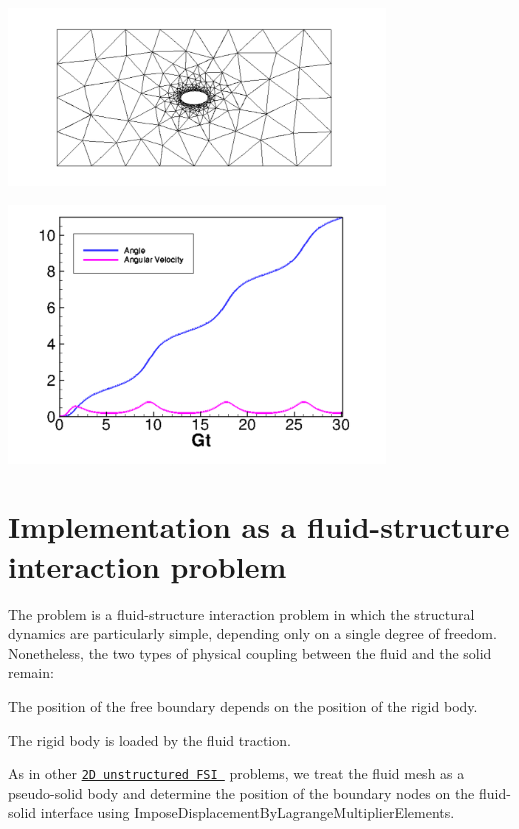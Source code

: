  
\begin{DoxyImage}
\includegraphics[width=0.75\textwidth]{orbit_mesh}
\end{DoxyImage}


 
\begin{DoxyImage}
\includegraphics[width=0.75\textwidth]{jeff_graph}
\end{DoxyImage}
\hypertarget{index_fsi}{}\section{Implementation as a fluid-\/structure interaction problem}\label{index_fsi}
The problem is a fluid-\/structure interaction problem in which the structural dynamics are particularly simple, depending only on a single degree of freedom. Nonetheless, the two types of physical coupling between the fluid and the solid remain\+:
\begin{DoxyEnumerate}
\item The position of the free boundary depends on the position of the rigid body.
\item The rigid body is loaded by the fluid traction.
\end{DoxyEnumerate}As in other \href{../../../../doc/interaction/unstructured_fsi/html/index.html}{\tt 2D unstructured F\+SI } problems, we treat the fluid mesh as a pseudo-\/solid body and determine the position of the boundary nodes on the fluid-\/solid interface using {\ttfamily Impose\+Displacement\+By\+Lagrange\+Multiplier\+Elements}.

